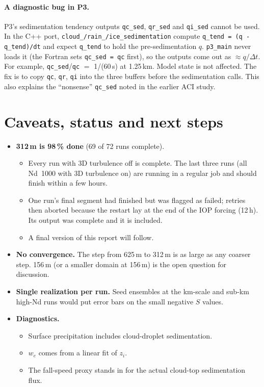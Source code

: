 \documentclass[10pt]{article}
\begin{document}
\paragraph{A diagnostic bug in P3.} P3's sedimentation tendency outputs \texttt{qc\_sed}, \texttt{qr\_sed} and \texttt{qi\_sed} cannot be used. In the C++ port,
\texttt{cloud\_/rain\_/ice\_sedimentation} compute \texttt{q\_tend = (q - q\_tend)/dt} and expect \texttt{q\_tend} to hold the pre-sedimentation $q$.
\texttt{p3\_main} never loads it (the Fortran sets \texttt{qc\_sed = qc} first), so the outputs come out as $\approx q/\Delta t$.
For example, \texttt{qc\_sed}/\texttt{qc} $=$ 1/(60\,s) at 1.25\,km. Model state is not affected. The fix is to copy \texttt{qc}, \texttt{qr}, \texttt{qi} into the three buffers before the sedimentation calls.
This also explains the ``nonsense'' \texttt{qc\_sed} noted in the earlier ACI study.

\section{Caveats, status and next steps}
\begin{itemize}
\item \textbf{312\,m is 98\,\% done} (69 of 72 runs complete).
\begin{itemize}
\item Every run with 3D turbulence off is complete. The last three runs (all Nd~1000 with 3D turbulence on) are running in a regular job and should finish within a few hours.
\item One run's final segment had finished but was flagged as failed; retries then aborted because the restart lay at the end of the IOP forcing (12\,h). Its output was complete and it is included.
\item A final version of this report will follow.
\end{itemize}
\item \textbf{No convergence.} The step from 625\,m to 312\,m is as large as any coarser step. 156\,m (or a smaller domain at 156\,m) is the open question for discussion.
\item \textbf{Single realization per run.} Seed ensembles at the km-scale and sub-km high-Nd runs would put error bars on the small negative $S$ values.
\item \textbf{Diagnostics.}
\begin{itemize}
\item Surface precipitation includes cloud-droplet sedimentation.
\item $w_e$ comes from a linear fit of $z_i$.
\item The fall-speed proxy stands in for the actual cloud-top sedimentation flux.
\end{itemize}
\end{itemize}
\end{document}
